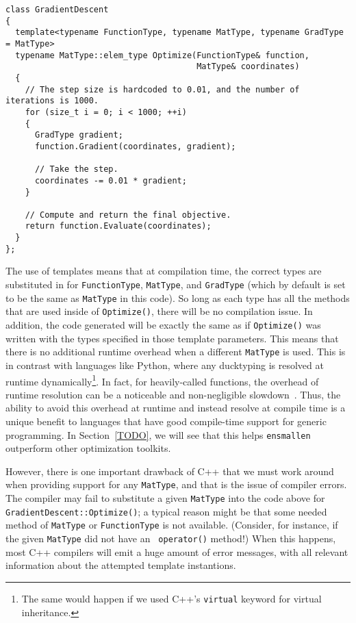 \begin{verbatim}
class GradientDescent
{
  template<typename FunctionType, typename MatType, typename GradType = MatType>
  typename MatType::elem_type Optimize(FunctionType& function,
                                       MatType& coordinates)
  {
    // The step size is hardcoded to 0.01, and the number of iterations is 1000.
    for (size_t i = 0; i < 1000; ++i)
    {
      GradType gradient;
      function.Gradient(coordinates, gradient);

      // Take the step.
      coordinates -= 0.01 * gradient;
    }

    // Compute and return the final objective.
    return function.Evaluate(coordinates);
  }
};
\end{verbatim}

The use of templates means that at compilation time, the correct types are
substituted in for {\tt FunctionType}, {\tt MatType}, and {\tt GradType} (which
by default is set to be the same as {\tt MatType} in this code).  So long as
each type has all the methods that are used inside of {\tt Optimize()}, there
will be no compilation issue.  In addition, the code generated will be exactly
the same as if {\tt Optimize()} was written with the types specified in those
template parameters.  This means that there is no additional runtime overhead
when a different {\tt MatType} is used.  This is in contrast with languages like
Python, where any ducktyping is resolved at runtime dynamically\footnote{The
same would happen if we used C++'s {\tt virtual} keyword for virtual
inheritance.}.  In fact, for heavily-called functions, the overhead of runtime
resolution can be a noticeable and non-negligible slowdown~\cite{TODO}.
Thus, the ability to avoid this overhead at runtime and instead resolve at
compile time is a unique benefit to languages that have good compile-time
support for generic programming.  In Section~\ref{TODO}, we will see that this
helps {\tt ensmallen} outperform other optimization toolkits.

However, there is one important drawback of C++ that we must work around when
providing support for any {\tt MatType}, and that is the issue of compiler
errors.  The compiler may fail to substitute a given {\tt MatType} into the
code above for {\tt GradientDescent::Optimize()}; a typical reason might be that
some needed method of {\tt MatType} or {\tt FunctionType} is not available.
(Consider, for instance, if the given {\tt MatType} did not have an {\tt
operator\*()} method!)  When this happens, most C++ compilers will emit a huge
amount of error messages, with all relevant information about the attempted
template instantions.

